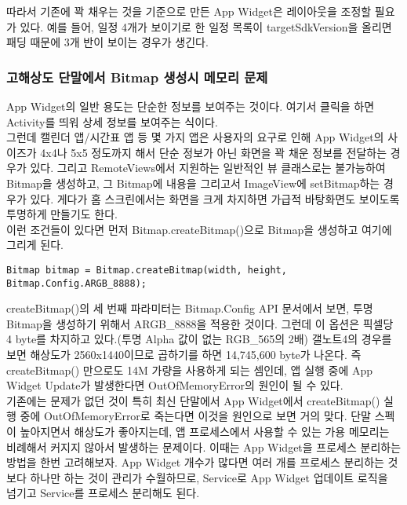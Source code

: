 따라서 기존에 꽉 채우는 것을 기준으로 만든 App Widget은 레이아웃을 조정할 필요가 있다. 예를 들어, 일정 4개가 보이기로 한 일정 목록이 targetSdkVersion을 올리면 패딩 때문에 3개 반이 보이는 경우가 생긴다.

\subsubsection{고해상도 단말에서 Bitmap 생성시 메모리 문제}
App Widget의 일반 용도는 단순한 정보를 보여주는 것이다. 여기서 클릭을 하면 Activity를 띄워 상세 정보를 보여주는 식이다.\\

그런데 캘린더 앱/시간표 앱 등 몇 가지 앱은 사용자의 요구로 인해 App Widget의 사이즈가 4x4나 5x5 정도까지 해서 단순 정보가 아닌 화면을 꽉 채운 정보를 전달하는 경우가 있다.
그리고 RemoteViews에서 지원하는 일반적인 뷰 클래스로는 불가능하여 Bitmap을 생성하고, 그 Bitmap에 내용을 그리고서 ImageView에 setBitmap하는 경우가 있다.
게다가 홈 스크린에서는 화면을 크게 차지하면 가급적 바탕화면도 보이도록 투명하게 만들기도 한다.\\

이런 조건들이 있다면 먼저 Bitmap.createBitmap()으로 Bitmap을 생성하고 여기에 그리게 된다.
\begin{verbatim}
Bitmap bitmap = Bitmap.createBitmap(width, height, Bitmap.Config.ARGB_8888); 
\end{verbatim}
createBitmap()의 세 번째 파라미터는 Bitmap.Config API 문서에서 보면, 투명 Bitmap을 생성하기 위해서 ARGB\_8888을 적용한 것이다.
그런데 이 옵션은 픽셀당 4 byte를 차지하고 있다.(투명 Alpha 값이 없는 RGB\_565의 2배) 갤노트4의 경우를 보면 해상도가 2560x1440이므로 곱하기를 하면 14,745,600 byte가 나온다. 즉 createBitmap() 만으로도 14M 가량을 사용하게 되는 셈인데, 앱 실행 중에 App Widget Update가 발생한다면 OutOfMemoryError의 원인이 될 수 있다.\\

기존에는 문제가 없던 것이 특히 최신 단말에서 App Widget에서 createBitmap() 실행 중에 OutOfMemoryError로 죽는다면 이것을 원인으로 보면 거의 맞다.
단말 스펙이 높아지면서 해상도가 좋아지는데, 앱 프로세스에서 사용할 수 있는 가용 메모리는 비례해서 커지지 않아서 발생하는 문제이다.
이때는 App Widget을 프로세스 분리하는 방법을 한번 고려해보자.
App Widget 개수가 많다면 여러 개를 프로세스 분리하는 것보다 하나만 하는 것이 관리가 수월하므로, Service로 App Widget 업데이트 로직을 넘기고 Service를 프로세스 분리해도 된다.
